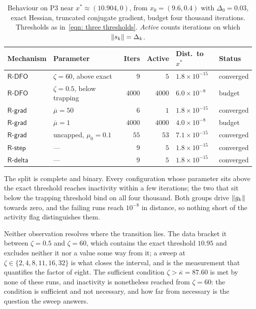\documentclass[11pt]{article}
\theoremstyle{plain}
\theoremstyle{definition}
\theoremstyle{remark}
\numberwithin{equation}{section}
\newcommand{\Rdelta}{\textsf{R-delta}}
\newcommand{\Rstep}{\textsf{R-step}}
\newcommand{\Rdfo}{\textsf{R-DFO}}
\newcommand{\Rgrad}{\textsf{R-grad}}
\providecommand{\kbar}{\overline{\kappa}}
\providecommand{\kbar}{\overline{\kappa}}
\begin{document}
\begin{table}[htbp]
  \centering
  \caption{Behaviour on P3 near $x^* \approx (10.904,0)$, from
           $x_0 = (9.6,0.4)$ with $\Delta_0 = 0.03$, exact Hessian, truncated
           conjugate gradient, budget four thousand
           iterations.\provisional{} Thresholds
           as in~\eqref{eqn: three thresholds}. \emph{Active} counts iterations
           on which $\left \lVert s_k \right \rVert = \Delta_k$.}
  \label{tab: kappa}
  \small
  \begin{tabular}{@{}llrrll@{}}
    \toprule
    Mechanism & Parameter & Iters & Active & Dist.\ to $x^*$ & Status \\
    \midrule
    $\Rdfo$  & $\zeta = 60$, above exact       & $9$    & $5$    & $1.8\times10^{-15}$ & converged \\
    $\Rdfo$  & $\zeta = 0.5$, below trapping   & $4000$ & $4000$ & $6.0\times10^{-8}$  & budget \\
    $\Rgrad$ & $\overline{\mu} = 50$           & $6$    & $1$    & $1.8\times10^{-15}$ & converged \\
    $\Rgrad$ & $\overline{\mu} = 1$            & $4000$ & $4000$ & $4.0\times10^{-8}$  & budget \\
    $\Rgrad$ & uncapped, $\mu_0 = 0.1$         & $55$   & $53$   & $7.1\times10^{-15}$ & converged \\
    $\Rstep$ & ---                             & $9$    & $5$    & $1.8\times10^{-15}$ & converged \\
    $\Rdelta$& ---                             & $9$    & $5$    & $1.8\times10^{-15}$ & converged \\
    \bottomrule
  \end{tabular}
\end{table}

The split is complete and binary. Every configuration whose parameter sits above
the exact threshold reaches inactivity within a few iterations; the two that sit
below the trapping threshold bind on all four thousand. Both groups drive
$\left \lVert g_k \right \rVert$ towards zero, and the failing runs reach $10^{-8}$ in distance, so
nothing short of the activity flag distinguishes them.

Neither observation resolves where the transition lies. The data bracket it
between $\zeta = 0.5$ and $\zeta = 60$, which contains the exact threshold
$10.95$ and excludes neither it nor a value some way from it; a sweep at
$\zeta \in \{2, 4, 8, 11, 16, 32\}$ is what closes the interval, and is the
measurement that quantifies the factor of eight. The sufficient condition
$\zeta > \kbar = 87.60$ is met by none of these runs, and inactivity is
nonetheless reached from $\zeta = 60$: the condition is sufficient and not
necessary, and how far from necessary is the question the sweep answers.
\end{document}
